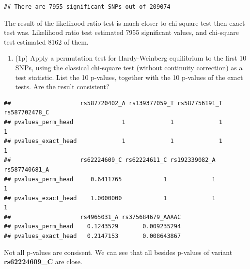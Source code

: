 \documentclass[
]{article}
\newenvironment{Shaded}{\begin{snugshade}}{\end{snugshade}}
\newcommand{\ControlFlowTok}[1]{\textcolor[rgb]{0.13,0.29,0.53}{\textbf{#1}}}
\newcommand{\DataTypeTok}[1]{\textcolor[rgb]{0.13,0.29,0.53}{#1}}
\newcommand{\DecValTok}[1]{\textcolor[rgb]{0.00,0.00,0.81}{#1}}
\newcommand{\KeywordTok}[1]{\textcolor[rgb]{0.13,0.29,0.53}{\textbf{#1}}}
\newcommand{\NormalTok}[1]{#1}
\newcommand{\OperatorTok}[1]{\textcolor[rgb]{0.81,0.36,0.00}{\textbf{#1}}}
\newcommand{\OtherTok}[1]{\textcolor[rgb]{0.56,0.35,0.01}{#1}}
\newcommand{\StringTok}[1]{\textcolor[rgb]{0.31,0.60,0.02}{#1}}
\providecommand{\tightlist}{%
  \setlength{\itemsep}{0pt}\setlength{\parskip}{0pt}}
\begin{document}
\begin{verbatim}
## There are 7955 significant SNPs out of 209074
\end{verbatim}

The result of the likelihood ratio test is much closer to chi-square
test then exact test was. Likelihood ratio test estimated 7955
significant values, and chi-square test estimated 8162 of them.

\begin{enumerate}
\def\labelenumi{\arabic{enumi}.}
\setcounter{enumi}{10}
\tightlist
\item
  (1p) Apply a permutation test for Hardy-Weinberg equilibrium to the
  first 10 SNPs, using the classical chi-square test (without continuity
  correction) as a test statistic. List the 10 p-values, together with
  the 10 p-values of the exact tests. Are the result consistent?
\end{enumerate}

\begin{Shaded}
\end{Shaded}

\begin{verbatim}
##                    rs587720402_A rs139377059_T rs587756191_T rs587702478_C
## pvalues_perm_head              1             1             1             1
## pvalues_exact_head             1             1             1             1
##                    rs62224609_C rs62224611_C rs192339082_A rs587740681_A
## pvalues_perm_head     0.6411765            1             1             1
## pvalues_exact_head    1.0000000            1             1             1
##                    rs4965031_A rs375684679_AAAAC
## pvalues_perm_head    0.1243529       0.009235294
## pvalues_exact_head   0.2147153       0.008643867
\end{verbatim}

Not all p-values are consisent. We can see that all besides p-values of
variant \textbf{rs62224609\_C} are close.
\end{document}
